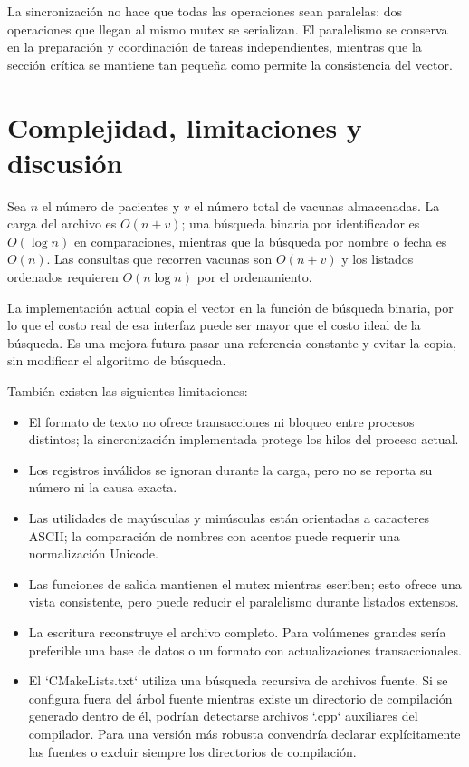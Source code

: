 \documentclass[12pt,letterpaper]{article}
\begin{document}
La sincronización no hace que todas las operaciones sean paralelas: dos
operaciones que llegan al mismo mutex se serializan. El paralelismo se conserva
en la preparación y coordinación de tareas independientes, mientras que la
sección crítica se mantiene tan pequeña como permite la consistencia del
vector.

\section{Complejidad, limitaciones y discusión}

Sea $n$ el número de pacientes y $v$ el número total de vacunas almacenadas.
La carga del archivo es $O(n+v)$; una búsqueda binaria por identificador es
$O(\log n)$ en comparaciones, mientras que la búsqueda por nombre o fecha es
$O(n)$. Las consultas que recorren vacunas son $O(n+v)$ y los listados
ordenados requieren $O(n\log n)$ por el ordenamiento.

La implementación actual copia el vector en la función de búsqueda binaria,
por lo que el costo real de esa interfaz puede ser mayor que el costo ideal de
la búsqueda. Es una mejora futura pasar una referencia constante y evitar la
copia, sin modificar el algoritmo de búsqueda.

También existen las siguientes limitaciones:

\begin{itemize}[leftmargin=1.2cm]
    \item El formato de texto no ofrece transacciones ni bloqueo entre
    procesos distintos; la sincronización implementada protege los hilos del
    proceso actual.
    \item Los registros inválidos se ignoran durante la carga, pero no se
    reporta su número ni la causa exacta.
    \item Las utilidades de mayúsculas y minúsculas están orientadas a
    caracteres ASCII; la comparación de nombres con acentos puede requerir una
    normalización Unicode.
    \item Las funciones de salida mantienen el mutex mientras escriben; esto
    ofrece una vista consistente, pero puede reducir el paralelismo durante
    listados extensos.
    \item La escritura reconstruye el archivo completo. Para volúmenes grandes
    sería preferible una base de datos o un formato con actualizaciones
    transaccionales.
    \item El `CMakeLists.txt` utiliza una búsqueda recursiva de archivos fuente.
    Si se configura fuera del árbol fuente mientras existe un directorio de
    compilación generado dentro de él, podrían detectarse archivos `.cpp`
    auxiliares del compilador. Para una versión más robusta convendría declarar
    explícitamente las fuentes o excluir siempre los directorios de compilación.
\end{itemize}
\end{document}
